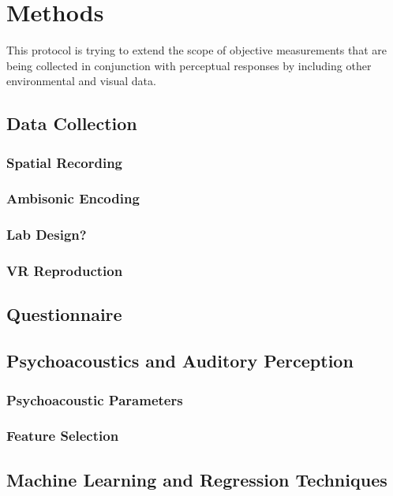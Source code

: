 \chapter{Methods}
\label{ch:methods}

This protocol is trying to extend the scope of objective measurements that are being collected in conjunction with perceptual responses by including other environmental and visual data.

\section{Data Collection}

\subsection{Spatial Recording}

\subsection{Ambisonic Encoding}

\subsection{Lab Design?}

\subsection{VR Reproduction}

\section{Questionnaire}

\section{Psychoacoustics and Auditory Perception}

\subsection{Psychoacoustic Parameters}

\subsection{Feature Selection}

\section{Machine Learning and Regression Techniques}

